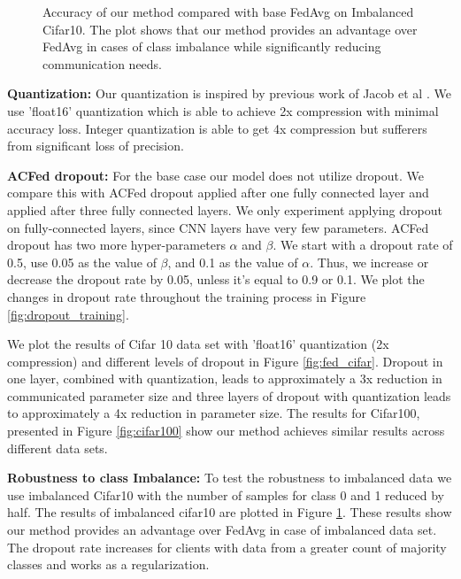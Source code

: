 \documentclass{article}
\begin{document}
\begin{figure}[ht]
\begin{minipage}{.45\textwidth}
    \caption{Accuracy of our method compared with base FedAvg on Imbalanced Cifar10. The plot shows that our method provides an advantage over FedAvg in cases of class imbalance while significantly reducing communication needs.}
    \label{fig:imb_cifar}
  \end{minipage}
\end{figure}


\textbf{Quantization: } Our quantization is inspired by previous work of Jacob et al \cite{jacob2018quantization}. We use 'float16' quantization which is able to achieve 2x compression with minimal accuracy loss. Integer quantization is able to get 4x compression but sufferers from significant loss of precision.

\textbf{ACFed dropout: } For the base case our model does not utilize dropout. We compare this with ACFed dropout applied after one fully connected layer and applied after three fully connected layers. We only experiment applying dropout on fully-connected layers, since CNN layers have very few parameters. ACFed dropout has two more hyper-parameters $\alpha$ and $\beta$. We start with a dropout rate of 0.5, use 0.05 as the value of $\beta$, and 0.1 as the value of $\alpha$. Thus, we increase or decrease the dropout rate by 0.05, unless it's equal to 0.9 or 0.1. We plot the changes in dropout rate throughout the training process in Figure \ref{fig:dropout_training}.

We plot the results of Cifar 10 data set with 'float16' quantization (2x compression) and different levels of dropout in Figure \ref{fig:fed_cifar}. Dropout in one layer, combined with quantization, leads to approximately a 3x reduction in communicated parameter size and three layers of dropout with quantization leads to approximately a 4x reduction in parameter size. The results for Cifar100, presented in Figure \ref{fig:cifar100} show our method achieves similar results across different data sets. 

\textbf{Robustness to class Imbalance: }To test the robustness to imbalanced data we use imbalanced Cifar10 with the number of samples for class 0 and 1 reduced by half. The results of imbalanced cifar10 are plotted in Figure \ref{fig:imb_cifar}. These results show our method provides an advantage over FedAvg in case of imbalanced data set. The dropout rate increases for clients with data from a greater count of majority classes and works as a regularization.
\end{document}
